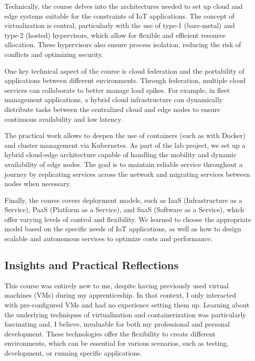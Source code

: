 Technically, the course delves into the architectures needed to set up cloud and edge systems suitable for the constraints of IoT applications. The concept of virtualization is central, particularly with the use of type-1 (bare-metal) and type-2 (hosted) hypervisors, which allow for flexible and efficient resource allocation. These hypervisors also ensure process isolation, reducing the risk of conflicts and optimizing security.

One key technical aspect of the course is cloud federation and the portability of applications between different environments. Through federation, multiple cloud services can collaborate to better manage load spikes. For example, in fleet management applications, a hybrid cloud infrastructure can dynamically distribute tasks between the centralized cloud and edge nodes to ensure continuous availability and low latency.

The practical work allows to deepen the use of containers (such as with Docker) and cluster management via Kubernetes. As part of the lab project, we set up a hybrid cloud-edge architecture capable of handling the mobility and dynamic availability of edge nodes. The goal is to maintain reliable service throughout a journey by replicating services across the network and migrating services between nodes when necessary.

Finally, the course covers deployment models, such as IaaS (Infrastructure as a Service), PaaS (Platform as a Service), and SaaS (Software as a Service), which offer varying levels of control and flexibility. We learned to choose the appropriate model based on the specific needs of IoT applications, as well as how to design scalable and autonomous services to optimize costs and performance.

\subsection{Insights and Practical Reflections}

This course was entirely new to me, despite having previously used virtual machines (VMs) during my apprenticeship. In that context, I only interacted with pre-configured VMs and had no experience setting them up. Learning about the underlying techniques of virtualization and containerization was particularly fascinating and, I believe, invaluable for both my professional and personal development. These technologies offer the flexibility to create different environments, which can be essential for various scenarios, such as testing, development, or running specific applications.

